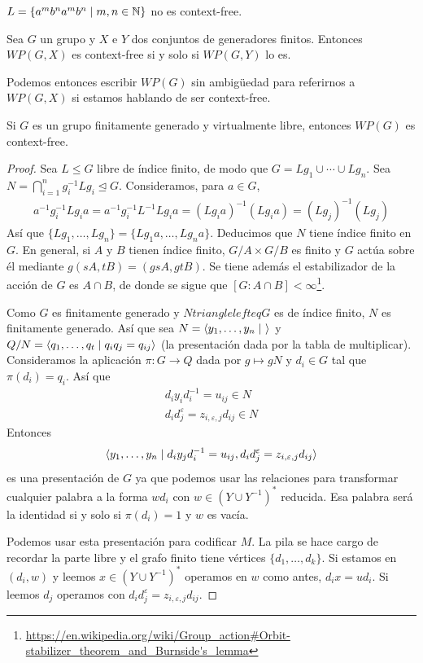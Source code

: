 \documentclass[twoside, 11pt]{article}
\begin{document}
\begin{ej}
$L=\{a^mb^na^mb^n\mid m,n\in\mathbb{N}\}$ no es context-free. 
\end{ej}

\begin{lemma}
Sea $G$ un grupo y $X$ e $Y$ dos conjuntos de generadores finitos. Entonces $WP(G,X)$ es context-free si y solo si $WP(G,Y)$ lo es. 
\end{lemma}

Podemos entonces escribir $WP(G)$ sin ambigüedad para referirnos a $WP(G,X)$ si estamos hablando de ser context-free. 

\begin{lemma}
Si $G$ es un grupo finitamente generado y virtualmente libre, entonces $WP(G)$ es context-free. 
\end{lemma}
\begin{proof}
Sea $L\leq G$ libre de índice finito, de modo que $G=Lg_1\cup\cdots\cup Lg_n$. Sea $N=\bigcap_{i=1}^n g_i^{-1}Lg_i\trianglelefteq G$. Consideramos, para $a\in G$,
\begin{gather*}
a^{-1}g_i^{-1}Lg_ia=a^{-1}g_i^{-1}L^{-1}Lg_ia=(Lg_ia)^{-1}(Lg_ia)=(Lg_j)^{-1}(Lg_j)
\end{gather*}
Así que $\{Lg_1,\dots, Lg_n\}=\{Lg_1a,\dots, Lg_na\}$. Deducimos que $N$ tiene índice finito en $G$. En general, si $A$ y $B$ tienen índice finito, $G/A\times G/B$ es finito y $G$ actúa sobre él mediante $g(sA,tB)=(gsA,gtB)$. Se tiene además el estabilizador de la acción de $G$ es $A\cap B$, de donde se sigue que $[G:A\cap B]<\infty$\footnote{\url{https://en.wikipedia.org/wiki/Group_action\#Orbit-stabilizer_theorem_and_Burnside's_lemma}}.

Como $G$ es finitamente generado y $Ntrianglelefteq G$ es de índice finito, $N$ es finitamente generado. Así que sea $N=\langle{y_1,\dots, y_n\mid\ }\rangle$ y $Q/N=\langle{q_1,\dots, q_t\mid q_iq_j=q_{ij}}\rangle$ (la presentación dada por la tabla de multiplicar). Consideramos la aplicación $\pi: G\to Q$ dada por $g\mapsto gN$ y $d_i\in G$ tal que $\pi(d_i)=q_i$. Así que 
\begin{gather*}
d_iy_id_i^{-1}=u_{ij}\in N\\
d_id_j^{\varepsilon}=z_{i,\varepsilon,j}d_{ij}\in N
\end{gather*}
Entonces 
\[
\langle{y_1,\dots, y_n\mid d_iy_jd_i^{-1}=u_{ij}, d_id_j^{\varepsilon}=z_{i,\varepsilon,j}d_{ij}}\rangle
\]
es una presentación de $G$ ya que podemos usar las relaciones para transformar cualquier palabra a la forma $wd_i$ con $w\in (Y\cup Y^{-1})^*$ reducida. Esa palabra será la identidad si y solo si $\pi(d_i)=1$ y $w$ es vacía. 

Podemos usar esta presentación para codificar $M$. La pila se hace cargo de recordar la parte libre y el grafo finito tiene vértices $\{d_1,\dots, d_k\}$. Si estamos en $(d_i,w)$ y leemos $x\in (Y\cup Y^{-1})^*$ operamos en $w$ como antes, $d_ix=ud_i$. Si leemos $d_j$ operamos con $d_id_j^{\varepsilon}=z_{i,\varepsilon,j}d_{ij}$.
\end{proof}
\end{document}
